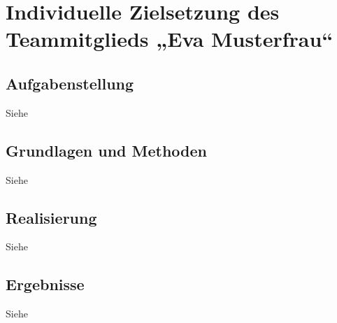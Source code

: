 \section{Individuelle Zielsetzung des Teammitglieds „Eva
Musterfrau“}
\label{sec:student2main}


\subsection{Aufgabenstellung}

Siehe 

\subsection{Grundlagen und Methoden}

Siehe 

\subsection{Realisierung}

Siehe 

\subsection{Ergebnisse}

Siehe 


